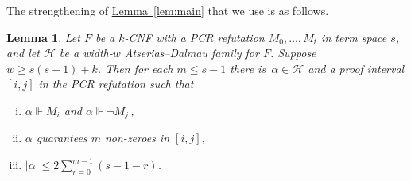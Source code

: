 \documentclass[11pt]{article}
\numberwithin{equation}{section}
\newtheorem{lemma}[theorem]{Lemma}
\theoremstyle{definition}
\theoremstyle{plain}
\newcommand{\expref}[2]{\hyperref[#2]{#1~\ref{#2}}}
\newcommand\calH{\mathcal{H}}
\begin{document}
The strengthening of \expref{Lemma}{lem:main} that we use is as follows.

\begin{lemma}\label{lem:main-bis}
Let $F$ be a $k$-CNF with a PCR refutation $M_0,\ldots,M_t$
in term space $s$,
and let $\calH$ be a width-$w$ Atserias--Dalmau family for $F$.
Suppose $w \ge s(s-1)+k$.
Then for each $m \le s-1$ there is~$\alpha \in \calH$ 
and a proof interval $[i,j]$ in the PCR refutation such that
\begin{enumerate}[(i)]
\item 
$\alpha \Vdash M_{i}$ and  $\alpha \Vdash \neg M_{j}$\,,
\item 
$\alpha$ guarantees $m$ non-zeroes in $[i,j]$,
\item 
$|\alpha| \le \displaystyle{2\sum_{r=0}^{m-1} (s - 1-r)}$.
\end{enumerate}
\end{lemma}
\end{document}
